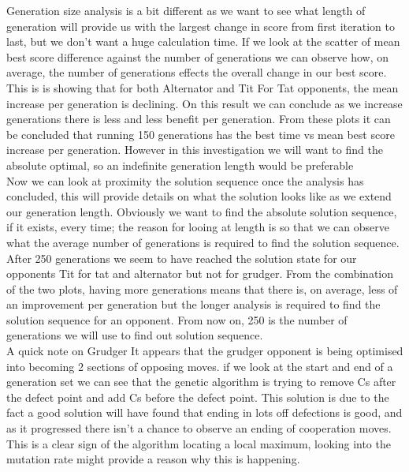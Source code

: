     
    Generation size analysis is a bit different as we want to see what length of generation will provide us with the largest change in score from first iteration to last, but we don't want a huge calculation time. If we look at the scatter of mean best score difference against the number of generations we can observe how, on average, the number of generations effects the overall change in our best score.\\ 


    This is is showing that for both Alternator and Tit For Tat opponents, the mean increase per generation is declining. On this result we can conclude as we increase generations there is less and less benefit per generation. From these plots it can be concluded that running 150 generations has the best time vs mean best score increase per generation. However in this investigation we will want to find the absolute optimal, so an indefinite generation length would be preferable\\
        
    Now we can look at proximity the solution sequence once the analysis has concluded, this will provide details on what the solution looks like as we extend our generation length. Obviously we want to find the absolute solution sequence, if it exists, every time; the reason for looing at length is so that we can observe what the average number of generations is required to find the solution sequence.\\
    
    
    After 250 generations we seem to have reached the solution state for our opponents Tit for tat and alternator but not for grudger. From the combination of the two plots, having more generations means that there is, on average, less of an improvement per generation but the longer analysis is required to find the solution sequence for an opponent. From now on, 250 is the number of generations we will use to find out solution sequence.\\ 

    A quick note on Grudger It appears that the grudger opponent is being optimised into becoming 2 sections of opposing moves. if we look at the start and end of a generation set we can see that the genetic algorithm is trying to remove Cs after the defect point and add Cs before the defect point. This solution is due to the fact a good solution will have found that ending in lots off defections is good, and as it progressed there isn't a chance to observe an ending of cooperation moves. This is a clear sign of the algorithm locating a local maximum, looking into the mutation rate might provide a reason why this is happening.\\
    
